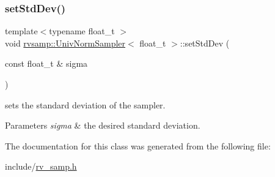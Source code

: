 \subsubsection{\texorpdfstring{set\+Std\+Dev()}{setStdDev()}}
{\footnotesize\ttfamily template$<$typename float\+\_\+t $>$ \\
void \hyperlink{classrvsamp_1_1UnivNormSampler}{rvsamp\+::\+Univ\+Norm\+Sampler}$<$ float\+\_\+t $>$\+::set\+Std\+Dev (\begin{DoxyParamCaption}\item[{const float\+\_\+t \&}]{sigma }\end{DoxyParamCaption})}



sets the standard deviation of the sampler. 


\begin{DoxyParams}{Parameters}
{\em sigma} & the desired standard deviation. \\
\hline
\end{DoxyParams}


The documentation for this class was generated from the following file\+:\begin{DoxyCompactItemize}
\item 
include/\hyperlink{rv__samp_8h}{rv\+\_\+samp.\+h}\end{DoxyCompactItemize}
